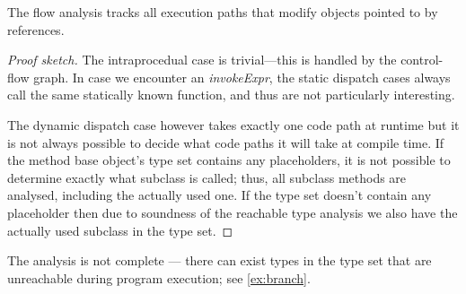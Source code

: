 \begin{theorem}
The flow analysis tracks all execution paths that modify objects pointed to by references.
\end{theorem}
\begin{proof}[Proof sketch]
The intraprocedual case is trivial---this is handled by the control-flow graph. In case we encounter an \emph{invokeExpr}, the static dispatch cases always call the same statically known function, and thus are not particularly interesting.

The dynamic dispatch case however takes exactly one code path at runtime but it is not always possible to decide what code paths it will take at compile time.
If the method base object's type set contains any placeholders, it is not possible to determine exactly what subclass is called; thus, all subclass methods are analysed, including the actually used one.
If the type set doesn't contain any placeholder then due to soundness of the reachable type analysis we also have the actually used subclass in the type set.
\end{proof}
\begin{remark}
The analysis is not complete --- there can exist types in the type set that are unreachable during program execution; see \cref{ex:branch}.
\end{remark}